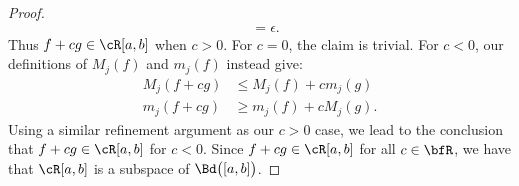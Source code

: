 \documentclass[10pt,twoside,openany]{memoir}
\begin{document}
\begin{proof}
\begin{equation*}
\begin{split}
                    & = \epsilon.
                \end{split}
                \end{equation*}
            Thus $f+cg \in \cR[a,b]$ when $c > 0$. For $c = 0$, the claim is trivial. For $c < 0$, our definitions of $M_j(f)$ and $m_j(f)$ instead give:
                \begin{equation*}
                \begin{split}
                    M_j(f + cg) &\leq M_j(f) + cm_j(g) \\
                    m_j(f + cg) &\geq m_j(f) + cM_j(g).
                \end{split}
                \end{equation*}
            Using a similar refinement argument as our $c > 0$ case, we lead to the conclusion that $f+cg \in \cR[a,b]$ for $c < 0$. Since $f+cg \in \cR[a,b]$ for all $c \in \bfR$, we have that $\cR[a,b]$ is a subspace of $\Bd\bigl([a,b]\bigr)$.
        \end{proof}
\end{document}
